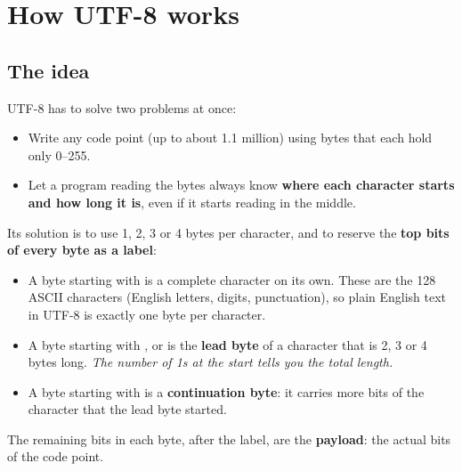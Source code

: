 \documentclass[10pt,a4paper]{article}
\begin{document}
\section{How UTF-8 works}
\subsection{The idea}
UTF-8 has to solve two problems at once:
\begin{itemize}
\item Write any code point (up to about 1.1 million) using bytes that each hold only 0–255.
\item Let a program reading the bytes always know \textbf{where each character starts and how long it is}, even if it starts reading in the middle.
\end{itemize}
Its solution is to use 1, 2, 3 or 4 bytes per character, and to reserve the \textbf{top bits of every byte as a label}:
\begin{itemize}
\item A byte starting with  is a complete character on its own. These are the 128 ASCII characters (English letters, digits, punctuation), so plain English text in UTF-8 is exactly one byte per character.
\item A byte starting with ,  or  is the \textbf{lead byte} of a character that is 2, 3 or 4 bytes long. \emph{The number of 1s at the start tells you the total length.}
\item A byte starting with  is a \textbf{continuation byte}: it carries more bits of the character that the lead byte started.
\end{itemize}
The remaining bits in each byte, after the label, are the \textbf{payload}: the actual bits of the code point.
\end{document}
